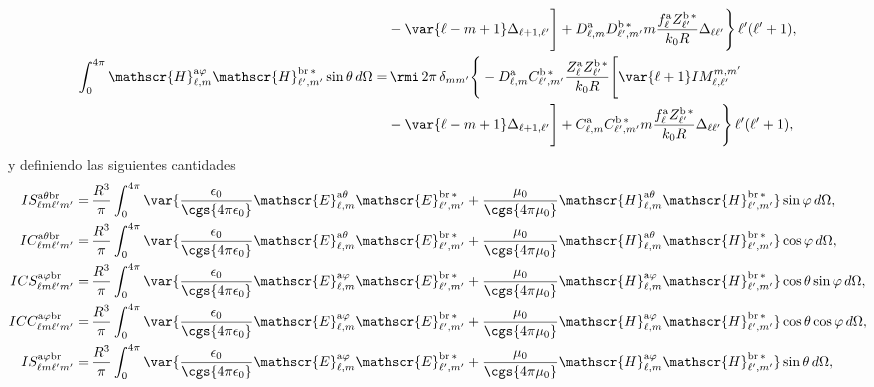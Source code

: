 \begin{align}
% 
&-\var{\ell - m +1} \Delta_{\ell + 1, \ell^{\prime}}  \Bigg]
%
+ D_{\ell, m}^{\rm a} D_{\ell^{\prime}, m^{\prime}}^{\rm b \, *} m \frac{f_{\ell}^{\rm a} Z_{\ell^{\prime}}^{\rm b\, *}}{k_0 R} \Delta_{\ell \ell^{\prime}} \Bigg\} \, \ell^{\prime}(\ell^{\prime}+1),\\
%
%
\int_0^{4\pi}\mathscr{H}_{\ell, m}^{\text{a}\varphi}\mathscr{H}_{\ell^{\prime}, m^{\prime}}^{\text{br}\,*}\sin\theta \, d\Omega
%
 =& \, \rmi \, 2\pi \, \delta_{m m^{\prime}} \Bigg\{ -D_{\ell, m}^{\rm a} C_{\ell^{\prime}, m^{\prime}}^{\rm b \, *} \frac{Z_{\ell}^{\rm a} Z_{\ell^{\prime}}^{\rm b \, *}}{k_0 R} \Bigg[\var{\ell +1} IM_{\ell, \ell^{\prime}}^{m, m^{\prime}} \nonumber \\ 
% 
&-\var{\ell - m +1} \Delta_{\ell + 1, \ell^{\prime}}  \Bigg]
%
+ C_{\ell, m}^{\rm a} C_{\ell^{\prime}, m^{\prime}}^{\rm b \, *} m \frac{f_{\ell}^{\rm a} Z_{\ell^{\prime}}^{\rm b\, *}}{k_0 R} \Delta_{\ell \ell^{\prime}} \Bigg\} \, \ell^{\prime}(\ell^{\prime}+1),
\end{align}
y definiendo las siguientes cantidades
\begin{align}
IS_{\ell m \ell^{\prime} m^{\prime}}^{\rm a \theta b r} 
=& \, \frac{R^3}{\pi} \int_{0}^{4\pi} \var{\frac{\epsilon_0}{\cgs{4\pi\epsilon_0}}\mathscr{E}_{\ell, m}^{\text{a}\theta}\mathscr{E}_{\ell^{\prime}, m^{\prime}}^{\text{br}\,*} + \frac{\mu_0}{\cgs{4\pi\mu_0}}\mathscr{H}_{\ell, m}^{\text{a}\theta}\mathscr{H}_{\ell^{\prime}, m^{\prime}}^{\text{br}\,*} } \sin\varphi \, d\Omega ,
\\
%
%
%
IC_{\ell m \ell^{\prime} m^{\prime}}^{\rm a \theta b r} 
=& \, \frac{R^3}{\pi} \int_{0}^{4\pi} \var{\frac{\epsilon_0}{\cgs{4\pi\epsilon_0}}\mathscr{E}_{\ell, m}^{\text{a}\theta}\mathscr{E}_{\ell^{\prime}, m^{\prime}}^{\text{br}\,*} + \frac{\mu_0}{\cgs{4\pi\mu_0}}\mathscr{H}_{\ell, m}^{\text{a}\theta}\mathscr{H}_{\ell^{\prime}, m^{\prime}}^{\text{br}\,*} } \cos\varphi \, d\Omega,\\
%
%
% 
ICS_{\ell m \ell^{\prime} m^{\prime}}^{\rm a \varphi b r}
=& \, \frac{R^3}{\pi} \int_0^{4\pi} \var{ \frac{\epsilon_0}{\cgs{4\pi\epsilon_0}} \mathscr{E}_{\ell, m}^{\text{a}\varphi}\mathscr{E}_{\ell^{\prime}, m^{\prime}}^{\text{br}\,*} + \frac{\mu_0}{\cgs{4\pi\mu_0}} \mathscr{H}_{\ell, m}^{\text{a}\varphi}\mathscr{H}_{\ell^{\prime}, m^{\prime}}^{\text{br}\,*}}\cos\theta\sin\varphi \, d\Omega,  \\
%
%
%
ICC_{\ell m \ell^{\prime} m^{\prime}}^{\rm a \varphi b r}
 =& \, \frac{R^3}{\pi} \int_0^{4\pi}\var{\frac{\epsilon_0}{\cgs{4\pi\epsilon_0}}\mathscr{E}_{\ell, m}^{\text{a}\varphi}\mathscr{E}_{\ell^{\prime}, m^{\prime}}^{\text{br}\,*} + \frac{\mu_0}{\cgs{4\pi\mu_0}}\mathscr{H}_{\ell, m}^{\text{a}\varphi}\mathscr{H}_{\ell^{\prime}, m^{\prime}}^{\text{br}\,*}}\cos\theta\cos\varphi \, d\Omega, \\
%
%
%
IS_{\ell m \ell^{\prime} m^{\prime}}^{\rm a \varphi b r}
 =& \, \frac{R^3}{\pi} \int_0^{4\pi}\var{\frac{\epsilon_0}{\cgs{4\pi\epsilon_0}}\mathscr{E}_{\ell, m}^{\text{a}\varphi}\mathscr{E}_{\ell^{\prime}, m^{\prime}}^{\text{br}\,*} + \frac{\mu_0}{\cgs{4\pi\mu_0}}\mathscr{H}_{\ell, m}^{\text{a}\varphi}\mathscr{H}_{\ell^{\prime}, m^{\prime}}^{\text{br}\,*}}\sin\theta \, d\Omega ,
\end{align}
